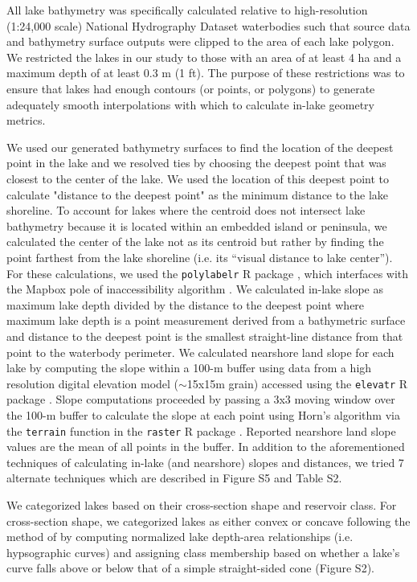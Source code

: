 \documentclass[draft]{agujournal2019}
\begin{document}
All lake bathymetry was specifically calculated relative to high-resolution (1:24,000 scale) National Hydrography Dataset \cite{usgsNationalHydrographyDataset2019} waterbodies such that source data and bathymetry surface outputs were clipped to the area of each lake polygon. We restricted the lakes in our study to those with an area of at least 4 ha and a maximum depth of at least 0.3 m (1 ft). The purpose of these restrictions was to ensure that lakes had enough contours (or points, or polygons) to generate adequately smooth interpolations with which to calculate in-lake geometry metrics.

We used our generated bathymetry surfaces to find the location of the deepest point in the lake and we resolved ties by choosing the deepest point that was closest to the center of the lake. We used the location of this deepest point to calculate "distance to the deepest point" as the minimum distance to the lake shoreline. To account for lakes where the centroid does not intersect lake bathymetry because it is located within an embedded island or peninsula, we calculated the center of the lake not as its centroid but rather by finding the point farthest from the lake shoreline (i.e. its “visual distance to lake center”). For these calculations, we used the \texttt{polylabelr} R package \cite{larssonPolylabelrFindPole2019}, which interfaces with the Mapbox pole of inaccessibility algorithm \cite{agafonkinJSLibraryFinding2019}. We calculated in-lake slope as maximum lake depth divided by the distance to the deepest point where maximum lake depth is a point measurement derived from a bathymetric surface and distance to the deepest point is the smallest straight-line distance from that point to the waterbody perimeter. We calculated nearshore land slope for each lake by computing the slope within a 100-m buffer using data from a high resolution digital elevation model ($\sim$15x15m grain) accessed using the \texttt{elevatr} R package \cite{hollisterElevatrAccessElevation2017}. Slope computations proceeded by passing a 3x3 moving window over the 100-m buffer to calculate the slope at each point using Horn's algorithm via the \texttt{terrain} function in the \texttt{raster} R package \cite{hijmansRasterGeographicData2019}. Reported nearshore land slope values are the mean of all points in the buffer. In addition to the aforementioned techniques of calculating in-lake (and nearshore) slopes and distances, we tried 7 alternate techniques which are described in Figure S5 and Table S2.

We categorized lakes based on their cross-section shape and reservoir class. For cross-section shape, we categorized lakes as either convex or concave following the method of  by computing normalized lake depth-area relationships (i.e. hypsographic curves) and assigning class membership based on whether a lake’s curve falls above or below that of a simple straight-sided cone (Figure S2).
\end{document}

